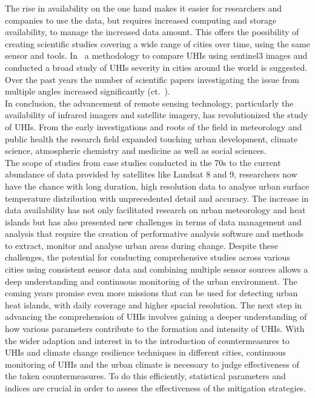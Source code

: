 \documentclass[12pt,a4paper, english,twoside]{article}
\begin{document}
  The rise in availability on the one hand makes it easier for researchers and companies to use the data, but requires increased computing and storage availability, to manage the increased data amount.
  This offers the possibility of creating scientific studies covering a wide range of cities over time, using the same sensor and tools. 
  In~\cite{Sobrino2020} a methodology to compare \glspl{UHI} using \gls{sentinel3} images and conducted a broad study of \glspl{UHI} severity in cities around the world is suggested.
  Over the past years the number of scientific papers investigating the issue from multiple angles increased significantly (ct.~\cite[P. 3]{Piracha2022b}).\\
  In conclusion, the advancement of remote sensing technology, particularly the availability of infrared imagers and satellite imagery, has revolutionized the study of \glspl{UHI}. 
  From the early investigations and roots of the field in meteorology and public health the research field expanded touching urban development, climate science, atmospheric chemistry and medicine as well as social sciences.\\
  The scope of studies from case studies conducted in the 70s to the current abundance of data provided by satellites like Landsat 8 and 9, researchers now have the chance with long duration, high resolution data to analyse urban surface temperature distribution with unprecedented detail and accuracy.
  The increase in data availability has not only facilitated research on urban meteorology and heat islands but has also presented new challenges in terms of data management and analysis that require the creation of performative analysis software and methods to extract, monitor and analyse urban areas during change.
  Despite these challenges, the potential for conducting comprehensive studies across various cities using consistent sensor data and combining multiple sensor sources allows a deep understanding and continuous monitoring of the urban environment.
  The coming years promise even more missions that can be used for detecting urban heat islands, with daily coverage and higher spacial resolution. 
  The next step in advancing the comprehension of \glspl{UHI} involves gaining a deeper understanding of how various parameters contribute to the formation and intensity of \glspl{UHI}.
  With the wider adaption and interest in to the introduction of countermeasures to \glspl{UHI} and climate change resilience techniques in different cities, continuous monitoring of \glspl{UHI} and the urban climate is necessary to judge effectiveness of the taken countermeasures.
  To do this efficiently, statistical parameters and indices are crucial in order to assess the effectiveness of the mitigation strategies. 
\end{document}
